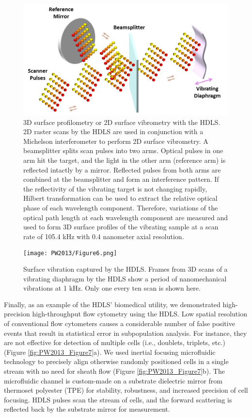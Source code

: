 \begin{figure}[htb!]
\centering
\includegraphics[scale=0.85]{PW2013/Figure5.png}
\caption{3D surface profilometry or 2D surface vibrometry with the HDLS. 2D raster scans by the HDLS are used in conjunction with a Michelson interferometer to perform 2D surface vibrometry. A beamsplitter splits scan pulses into two arms. Optical pulses in one arm hit the target, and the light in the other arm (reference arm) is reflected intactly by a mirror. Reflected pulses from both arms are combined at the beamsplitter and form an interference pattern. If the reflectivity of the vibrating target is not changing rapidly, Hilbert transformation can be used to extract the relative optical phase of each wavelength component. Therefore, variations of the optical path length at each wavelength component are measured and used to form 3D surface profiles of the vibrating sample at a scan rate of 105.4 kHz with 0.4 nanometer axial resolution.}
\label{fig:PW2013_Figure5}
\end{figure}
 
\begin{figure}[htb!]
\centering
\texttt{[image: PW2013/Figure6.png]}
\caption{Surface vibration captured by the HDLS. Frames from 3D scans of a vibrating diaphragm by the HDLS show a period of nanomechanical vibrations at 1 kHz. Only one every ten scan is shown here.}
\label{fig:PW2013_Figure6}
\end{figure}

Finally, as an example of the HDLS’ biomedical utility, we demonstrated high-precision high-throughput flow cytometry using the HDLS. Low spatial resolution of conventional flow cytometers causes a considerable number of false positive events that result in statistical error in subpopulation analysis. For instance, they are not effective for detection of multiple cells (i.e., doublets, triplets, etc.) (Figure \ref{fig:PW2013_Figure7}a). We used inertial focusing microfluidic technology \cite{di2009inertial} to precisely align otherwise randomly positioned cells in a single stream with no need for sheath flow (Figure \ref{fig:PW2013_Figure7}b). The microfluidic channel is custom-made on a substrate dielectric mirror from thermoset polyester (TPE) for stability, robustness, and increased precision of cell focusing. HDLS pulses scan the stream of cells, and the forward scattering is reflected back by the substrate mirror for measurement. 

